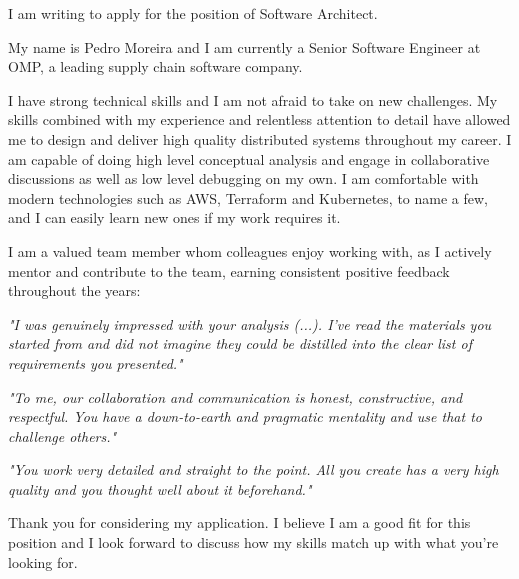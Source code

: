 I am writing to apply for the position of Software Architect.

My name is Pedro Moreira and I am currently a Senior Software Engineer at OMP, a leading supply chain software company.

I have strong technical skills and I am not afraid to take on new challenges. My skills combined with my experience and relentless attention to detail have allowed me to design and deliver high quality distributed systems throughout my career. I am capable of doing high level conceptual analysis and engage in collaborative discussions as well as low level debugging on my own. I am comfortable with modern technologies such as AWS, Terraform and Kubernetes, to name a few, and I can easily learn new ones if my work requires it.

I am a valued team member whom colleagues enjoy working with, as I actively mentor and contribute to the team, earning consistent positive feedback throughout the years:

\emph{"I was genuinely impressed with your analysis (...). I've read the materials you started from and did not imagine they could be distilled into the clear list of requirements you presented."}

\emph{"To me, our collaboration and communication is honest, constructive, and respectful. You have a down-to-earth and pragmatic mentality and use that to challenge others."}

\emph{"You work very detailed and straight to the point. All you create has a very high quality and you thought well about it beforehand."}

Thank you for considering my application. I believe I am a good fit for this position and I look forward to discuss how my skills match up with what you're looking for.
